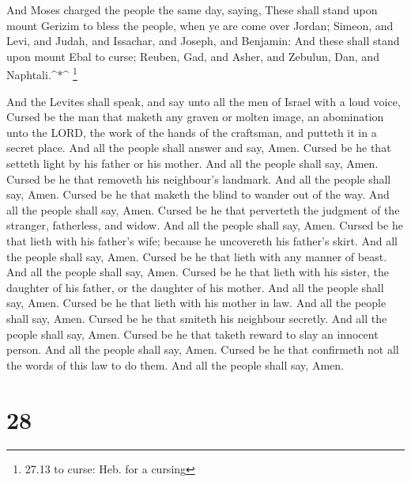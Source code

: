  And Moses charged the people the same day, saying,
 These shall stand upon mount Gerizim to bless the people,
when ye are come over Jordan; Simeon, and Levi, and Judah, and Issachar,
and Joseph, and Benjamin:  And these shall stand upon mount
Ebal to curse; Reuben, Gad, and Asher, and Zebulun, Dan, and
Naphtali.\^{}*\^{} \footnote{27.13 to curse: Heb. for a cursing}

 And the Levites shall speak, and say unto all the men of
Israel with a loud voice,  Cursed be the man that maketh
any graven or molten image, an abomination unto the LORD, the work of
the hands of the craftsman, and putteth it in a secret place. And all
the people shall answer and say, Amen.  Cursed be he that
setteth light by his father or his mother. And all the people shall say,
Amen.  Cursed be he that removeth his neighbour's landmark.
And all the people shall say, Amen.  Cursed be he that
maketh the blind to wander out of the way. And all the people shall say,
Amen.  Cursed be he that perverteth the judgment of the
stranger, fatherless, and widow. And all the people shall say, Amen.
 Cursed be he that lieth with his father's wife; because he
uncovereth his father's skirt. And all the people shall say, Amen.
 Cursed be he that lieth with any manner of beast. And all
the people shall say, Amen.  Cursed be he that lieth with
his sister, the daughter of his father, or the daughter of his mother.
And all the people shall say, Amen.  Cursed be he that
lieth with his mother in law. And all the people shall say, Amen.
 Cursed be he that smiteth his neighbour secretly. And all
the people shall say, Amen.  Cursed be he that taketh
reward to slay an innocent person. And all the people shall say, Amen.
 Cursed be he that confirmeth not all the words of this law
to do them. And all the people shall say, Amen.

\hypertarget{section-27}{%
\section{28}\label{section-27}}

